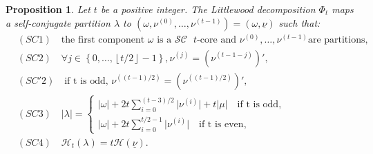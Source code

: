 \documentclass[11pt,letterpaper]{amsart}
\def\cch{\mathcal H}
\def\ccsc{\mathcal {SC}}
\newtheorem{prop}[df]{Proposition}		%
\numberwithin{equation}{section}
\numberwithin{df}{section}
\begin{document}
\begin{prop}\cite[Lemma 4.7]{MP}\label{SCLittlewood}
Let $t$ be a positive integer. The Littlewood decomposition $\Phi_t$ maps a self-conjugate partition $\lambda$ to $\left(\omega,\nu^{(0)},\dots,\nu^{(t-1)}\right)=(\omega,\underline{\nu})$ such that:
\begin{align*}
&(SC1)\quad \text{the first component } \omega \text{ is a $\ccsc$ $t$-core and }\nu^{(0)},\dots,\nu^{(t-1)} \text{are partitions},\\
&(SC2) \quad \forall j \in \left\lbrace 0,\dots,\left\lfloor t/2 \right\rfloor-1\right\rbrace, \nu^{(j)}=\left(\nu^{(t-1-j)}\right)',\\
&(SC'2)\quad  \text{if t is odd, } \nu^{\left((t-1)/2\right)}=\left(\nu^{\left((t-1)/2\right)}\right)', \\
&(SC3) \quad 
\lvert\lambda\rvert=\begin{cases}\displaystyle\lvert\omega\rvert+2t\sum_{i=0}^{(t-3)/2} \lvert\nu^{(i)}\rvert+t\lvert \mu\rvert \quad \text{if t is odd},
\\
\displaystyle\lvert\omega\rvert +2t\sum_{i=0}^{t/2-1} \lvert\nu^{(i)}\rvert \quad
 \text{if t is even},
\end{cases}\\
&(SC4)\quad \mathcal{H}_t(\lambda)=t\mathcal{H}(\underline{\nu}).
\end{align*}
\end{prop}
\end{document}
